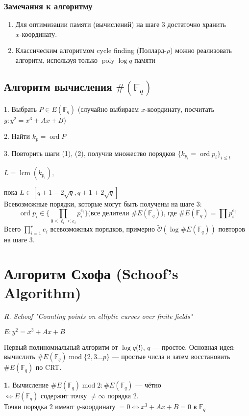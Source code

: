 \documentclass[12pt]{article}
\newcommand{\F}{{{\mathbb F}}}
\newcommand{\bigO}{\mathcal{O}}
\newcommand{\softO}{\widetilde{\bigO}}
\theoremstyle{definition}
\theoremstyle{definition}
\theoremstyle{definition}
\begin{document}
\subsubsection{Замечания к алгоритму}
\begin{enumerate}
    \item Для оптимизации памяти (вычислений) на шаге 3 достаточно хранить\\ $x$-координату.
    \item Классическим алгоритмом cycle finding (Поллард-$\rho$) можно реализовать алгоритм, используя только $\operatorname{poly} \log q$ памяти
\end{enumerate}

\subsection{Алгоритм вычисления $\#(\F_q)$}
1. Выбрать $P \in E(\F_q)$ (случайно выбираем $x$-координату, посчитать $y: y^2 = x^3 + Ax+B$)

2. Найти $k_p = \operatorname{ord}P$

3. Повторить шаги (1), (2), получив множество порядков $\{k_{p_i} = \operatorname{ord} p_i\}_{i\leq t}$

\quad $L = \operatorname{lcm}(k_{p_i})$,

пока $L \in \left[q+1-2\sqrt{q}, q+1+2\sqrt{q} \right]$\\

Всевозможные порядки, которые могут быть получены на шаге 3:
\[
    \operatorname{ord} p_i \in \{\prod_{0 \leq \ell_i \leq e_i} p_i^{e_i}\} \text{(все делители } \#E(\F_q)) \text{, где } \#E(\F_q) = \prod p_i^{e_i}
\]
Всего $\prod_{i=1}^r e_i$ всевозможных порядков, примерно $\softO(\log \#E(\F_q))$ повторов на шаге 3.

\section{Алгоритм Схофа (Schoof's Algorithm)}
\textit{R. Schoof "Counting points on elliptic curves over finite fields"}

$E: y^2 = x^3 + Ax + B$

Первый полиномиальный алгоритм от $\log q$(!), $q$ — простое. 
Основная идея: вычислить $\#E(\F_q) \operatorname{mod} \{2, 3 ... p\}$ — простые числа и затем восстановить $\#E(\F_q)$ по CRT.

\textbf{1.} Вычисление $\#E(\F_q) \operatorname{mod} 2: \#E(\F_q)$ — чётно \\
$\Leftrightarrow E(\F_q)$ содержит точку $\neq \infty$ порядка 2. \\
Точки порядка 2 имеют $y$-координату $= 0 \Leftrightarrow x^3 + Ax+B = 0$ в $\F_q$
\end{document}
